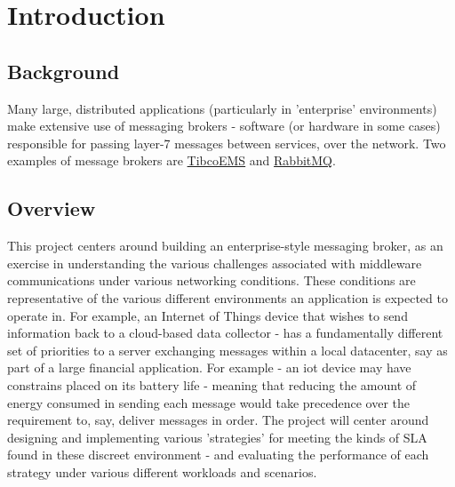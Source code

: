 \section{Introduction}
\label{sec:Introduction}

\subsection{Background}
\label{sub:Background}

Many large, distributed applications (particularly in 'enterprise' environments)
make extensive use of messaging brokers -
software (or hardware in some cases\cite{solaceappliances}) responsible for passing
layer-7 messages between services, over the network. Two examples of message
brokers are
\href{http://www.tibco.com/products/automation/enterprise-messaging/enterprise-message-service}{TibcoEMS}
and \href{https://www.rabbitmq.com/}{RabbitMQ}.

\subsection{Overview}
\label{sub:Overview}

This project centers around building an enterprise-style messaging broker,
as an exercise in understanding the various challenges associated with middleware
communications under various networking conditions. These conditions are
representative of the various different environments an application is expected
to operate in. For example, an Internet of Things device that wishes to send information back
to a cloud-based data collector - has a fundamentally different set of priorities
to a server exchanging messages within a local datacenter, say as part of a large
financial application. For example - an \gls{iot} device may
have constrains placed on its battery life - meaning that reducing the amount of
energy consumed in sending each message would take precedence over the
requirement to, say, deliver messages in order. The project will center around
designing and implementing various 'strategies' for meeting the kinds of SLA
found in these discreet environment - and evaluating the performance of each
strategy under various different workloads and scenarios.
